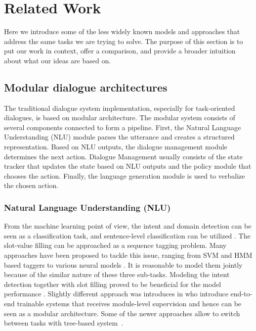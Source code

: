\chapter{Related Work}%
\label{chap:related}
\label{sec:relwork}
Here we introduce some of the less widely known models and approaches that address the same tasks we are trying to solve.
The purpose of this section is to put our work in context, offer a comparison, and provide a broader intuition about what our ideas are based on.

\section{Modular dialogue architectures}
\label{relwork:modular}
The traditional dialogue system implementation, especially for task-oriented dialogues, is based on modular architecture.
The modular system consists of several components connected to form a pipeline.
First, the Natural Language Understanding (NLU) module parses the utterance and creates a structured representation.
Based on NLU outputs, the dialogue management module determines the next action.
Dialogue Management usually consists of the state tracker that updates the state based on NLU outputs and the policy module that chooses the action.
Finally, the language generation module is used to verbalize the chosen action.
\subsection{Natural Language Understanding (NLU)}
From the machine learning point of view, the intent and domain detection can be seen as a classification task, and sentence-level classification can be utilized \cite{yaman2008integrative,schapire2000boostexter}.
The slot-value filling can be approached as a sequence tagging problem.
Many approaches have been proposed to tackle this issue, ranging from SVM \cite{shi2016recurrent} and HMM \cite{surendran2006dialog} based taggers to various neural models \cite{adel2016comparing, zhang2017position, mesnil2014using}.
It is reasonable to model them jointly because of the similar nature of these three sub-tasks.
Modeling the intent detection together with slot filling proved to be beneficial for the model performance \cite{zhang2017position, liu2016attention, xu2013convolutional}.
Slightly different approach was introduces in \citet{DBLP:conf/aaai/LiangTCY20} who introduce end-to-end trainable systems that receives module-level supervision and hence can be seen as a modular architecture.
Some of the newer approaches allow to switch between tasks with tree-based system~\cite{xie2022converse}.


